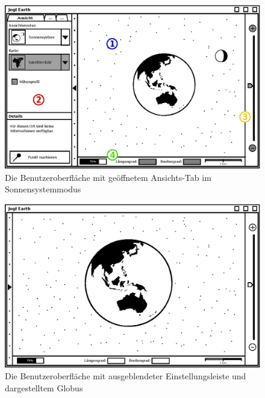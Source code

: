 \documentclass[10pt]{scrreprt}
\begin{document}
\vspace{1cm}
\begin{figure}[h]
	\centering
	\includegraphics[scale=0.9]{GUI-Sonnensystem.eps}
	\caption{Die Benutzeroberfläche mit geöffnetem Ansichts-Tab im Sonnensystemmodus}
\end{figure}

\begin{figure}
	\centering
	\includegraphics[scale=0.9]{GUI-Ausgeblendet.eps}
	\caption{Die Benutzeroberfläche mit ausgeblendeter Einstellungsleiste und dargestelltem Globus}
\end{figure}
\end{document}
